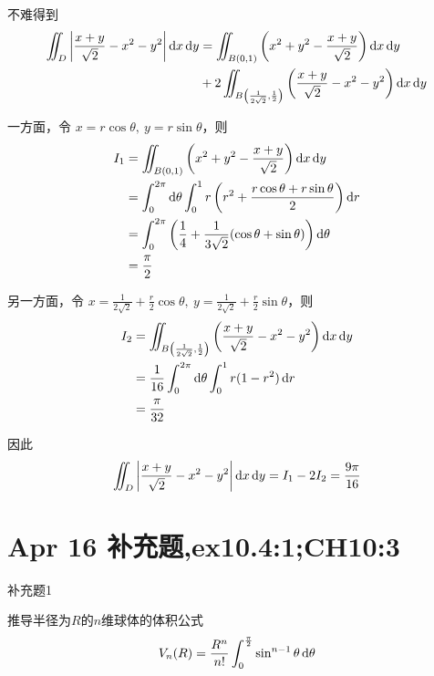 \begin{solution}
    不难得到
\begin{align*}
\iint_D \left| \frac{x + y}{\sqrt{2}} - x^2 - y^2 \right| \operatorname{d\!} x \operatorname{d\!} y 
&= \iint_{B(0,1)} \left( x^2 + y^2 - \frac{x + y}{\sqrt{2}} \right) \operatorname{d\!} x \operatorname{d\!} y \\
&+ 2 \iint_{B\left( \frac{1}{2\sqrt{2}}, \frac{1}{2} \right)} \left( \frac{x + y}{\sqrt{2}} - x^2 - y^2 \right) \operatorname{d\!} x \operatorname{d\!} y
\end{align*}

一方面，令 $x = r \cos \theta,\ y = r \sin \theta$，则
\begin{align*}
I_1 &= \iint_{B(0,1)} \left( x^2 + y^2 - \frac{x + y}{\sqrt{2}} \right) \operatorname{d\!} x \operatorname{d\!} y \\
&= \int_0^{2\pi} \operatorname{d\!} \theta \int_0^1 r \left( r^2 + \frac{r \cos \theta + r \sin \theta}{2} \right) \operatorname{d\!} r \\
&= \int_0^{2\pi} \left( \frac{1}{4} + \frac{1}{3\sqrt{2}} (\cos \theta + \sin \theta) \right) \operatorname{d\!} \theta \\
&= \frac{\pi}{2}
\end{align*}

另一方面，令 $x = \frac{1}{2\sqrt{2}} + \frac{r}{2} \cos \theta,\ y = \frac{1}{2\sqrt{2}} + \frac{r}{2} \sin \theta$，则
\begin{align*}
I_2 &= \iint_{B\left( \frac{1}{2\sqrt{2}}, \frac{1}{2} \right)} \left( \frac{x + y}{\sqrt{2}} - x^2 - y^2 \right) \operatorname{d\!} x \operatorname{d\!} y \\
&= \frac{1}{16} \int_0^{2\pi} \operatorname{d\!} \theta \int_0^1 r (1 - r^2) \operatorname{d\!} r \\
&= \frac{\pi}{32}
\end{align*}

因此
\begin{align*}
\iint_D \left| \frac{x + y}{\sqrt{2}} - x^2 - y^2 \right| \operatorname{d\!} x \operatorname{d\!} y 
= I_1 - 2I_2 = \frac{9\pi}{16}
\end{align*}
\end{solution}


\section{Apr 16 补充题,ex10.4:1;CH10:3}




\begin{exercise}
    {补充题1}

    推导半径为$R$的$n$维球体的体积公式$$V_n(R) = \frac{R^n}{n!} \int_0^{\frac{\pi}{2}} \sin^{n-1} \theta \operatorname{d\!} \theta$$
\end{exercise}



